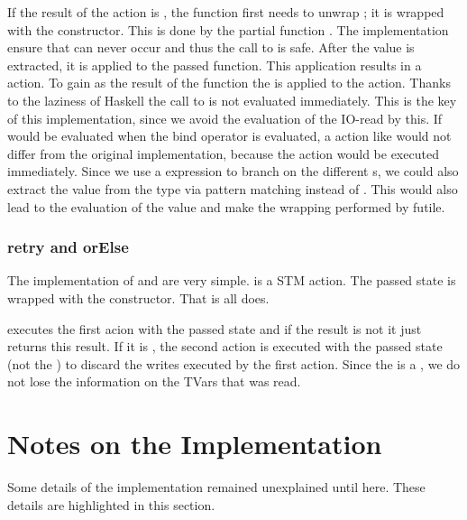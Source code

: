 If the result of the action is 
, the function first needs to unwrap ; it is wrapped with 
the  constructor. This is done by the partial function . The
implementation ensure that  can never occur and thus the call to 
 is safe. After the value is extracted, it is applied to the passed 
function. This application results in a  action. To gain  as 
the result of the function the  is applied to the action.
Thanks to the laziness of Haskell the call to  is not evaluated 
immediately. This is the key of this implementation, since we avoid the evaluation of 
the IO-read by this. If  would be evaluated when the bind operator is evaluated,
a action like  would not differ from the original implementation,
because the  action would be executed immediately. 
Since we use a  expression to branch on the different s, we 
could also extract the value from the  type  via pattern matching instead 
of . This would also lead to the evaluation of the value and 
make the wrapping performed by  futile.

\subsubsection{retry and orElse}
The implementation of  and  are very simple. 
 is a STM action. The passed state is wrapped with the  constructor.
That is all  does. 

 executes the first acion with the passed state and if the result is not 
 it just returns this result. If it is ,
the second action is executed with the passed state (not the ) to discard the 
writes executed by the first action. Since the  is a , 
we do not lose the information on the TVars that was read. 



\section{Notes on the Implementation}
Some details of the implementation remained unexplained until here. These details are highlighted
in this section.

